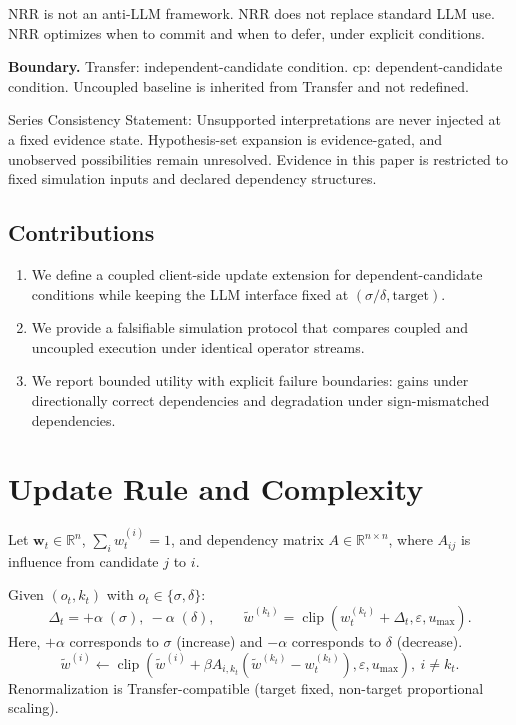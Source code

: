 \documentclass[11pt,a4paper]{article}
\begin{document}
NRR is not an anti-LLM framework.
NRR does not replace standard LLM use.
NRR optimizes when to commit and when to defer, under explicit conditions.

\textbf{Boundary.}
Transfer: independent-candidate condition.
cp: dependent-candidate condition.
Uncoupled baseline is inherited from Transfer and not redefined.

Series Consistency Statement: Unsupported interpretations are never injected at a fixed evidence state. Hypothesis-set expansion is evidence-gated, and unobserved possibilities remain unresolved. Evidence in this paper is restricted to fixed simulation inputs and declared dependency structures.

\subsection{Contributions}
\begin{enumerate}
  \item We define a coupled client-side update extension for dependent-candidate conditions while keeping the LLM interface fixed at \((\sigma/\delta,\text{target})\).
  \item We provide a falsifiable simulation protocol that compares coupled and uncoupled execution under identical operator streams.
  \item We report bounded utility with explicit failure boundaries: gains under directionally correct dependencies and degradation under sign-mismatched dependencies.
\end{enumerate}

\section{Update Rule and Complexity}
\label{sec:update_rule}
Let \(\mathbf{w}_t\in\mathbb{R}^n\), \(\sum_i w_t^{(i)}=1\), and dependency matrix \(A\in\mathbb{R}^{n\times n}\), where \(A_{ij}\) is influence from candidate \(j\) to \(i\).

Given \((o_t,k_t)\) with \(o_t\in\{\sigma,\delta\}\):
\[
\Delta_t = +\alpha\;(\sigma),\ -\alpha\;(\delta),\qquad
\tilde{w}^{(k_t)}=\operatorname{clip}(w_t^{(k_t)}+\Delta_t,\varepsilon,u_{\max}).
\]
Here, \(+\alpha\) corresponds to \(\sigma\) (increase) and \(-\alpha\) corresponds to \(\delta\) (decrease).
\[
\tilde{w}^{(i)} \leftarrow \operatorname{clip}(\tilde{w}^{(i)}+\beta A_{i,k_t}(\tilde{w}^{(k_t)}-w_t^{(k_t)}),\varepsilon,u_{\max}),\ i\neq k_t.
\]
Renormalization is Transfer-compatible (target fixed, non-target proportional scaling).
\end{document}
